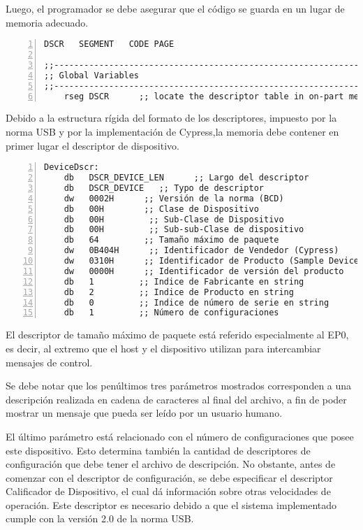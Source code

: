 	Luego, el programador se debe asegurar que el código se guarda en un lugar de memoria adecuado.
	
	\begin{lstlisting}[language={[x86masm]Assembler},backgroundcolor=\color{gray!30},numbers=left]
DSCR   SEGMENT   CODE PAGE

;;-----------------------------------------------------------------------------
;; Global Variables
;;-----------------------------------------------------------------------------
	rseg DSCR      ;; locate the descriptor table in on-part memory.
	\end{lstlisting}
	
	Debido a la estructura rígida del formato de los descriptores, impuesto por la norma USB y por la implementación de Cypress,la memoria debe contener en primer lugar el descriptor de dispositivo.
	
	\begin{lstlisting}[language={[x86masm]Assembler},backgroundcolor=\color{gray!30},numbers=left]
DeviceDscr:
	db   DSCR_DEVICE_LEN      ;; Largo del descriptor
	db   DSCR_DEVICE   ;; Typo de descriptor
	dw   0002H      ;; Versión de la norma (BCD)
	db   00H        ;; Clase de Dispositivo
	db   00H         ;; Sub-Clase de Dispositivo
	db   00H         ;; Sub-sub-Clase de dispositivo
	db   64         ;; Tamaño máximo de paquete
	dw   0B404H      ;; Identificador de Vendedor (Cypress) 
	dw   0310H      ;; Identificador de Producto (Sample Device)
	dw   0000H      ;; Identificador de versión del producto
	db   1         ;; Indice de Fabricante en string
	db   2         ;; Indice de Producto en string
	db   0         ;; Indice de número de serie en string
	db   1         ;; Número de configuraciones
	\end{lstlisting}
	
	El descriptor de tamaño máximo de paquete está referido especialmente al EP0, es decir, al extremo que el host y el dispositivo utilizan para intercambiar mensajes de control.
	
	Se debe notar que los penúltimos tres parámetros mostrados corresponden a una descripción realizada en cadena de caracteres al final del archivo, a fin de poder mostrar un mensaje que pueda ser leído por un usuario humano.
	
	El último parámetro está relacionado con el número de configuraciones que posee este dispositivo. Esto determina también la cantidad de descriptores de configuración que debe tener el archivo de descripción. No obstante, antes de comenzar con el descriptor de configuración, se debe especificar el descriptor Calificador de Dispositivo, el cual dá información sobre otras velocidades de operación. Este descriptor es necesario debido a que el sistema implementado cumple con la versión 2.0 de la norma USB.
	
